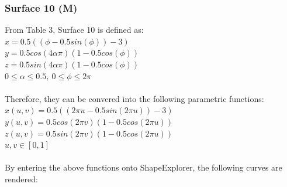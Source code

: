 \documentclass[acmlarge,nonacm=true]{acmart}
\begin{document}
\subsubsection{Surface 10 (M)} From Table 3, Surface 10 is defined as:\\
$x = 0.5((\phi-0.5sin(\phi))-3)$\\
$y = 0.5cos(4\alpha\pi)(1-0.5cos(\phi))$\\
$z = 0.5sin(4\alpha\pi)(1-0.5cos(\phi))$\\
$0\leq\alpha\leq0.5,\ 0\leq\phi\leq2\pi$\\\\
Therefore, they can be convered into the following parametric functions:\\
$x(u,v) = 0.5((2\pi u-0.5sin(2\pi u))-3)$\\
$y(u,v) = 0.5cos(2\pi v)(1-0.5cos(2\pi u))$\\
$z(u,v) = 0.5sin(2\pi v)(1-0.5cos(2\pi u))$\\
$u,v \in [0,1]$\\\\
By entering the above functions onto ShapeExplorer, the following curves are rendered:\\
\end{document}
